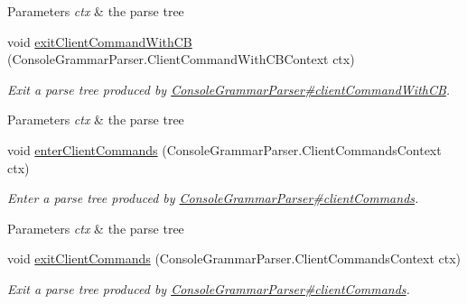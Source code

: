 \begin{DoxyCompactItemize}
\begin{DoxyCompactList}
\begin{DoxyParams}{Parameters}
{\em ctx} & the parse tree\\
\hline
\end{DoxyParams}
 \end{DoxyCompactList}\item 
void \hyperlink{classgov_1_1nasa_1_1jpf_1_1inspector_1_1client_1_1parser_1_1_console_grammar_base_listener_a18bdd4b1adc458d4564f2b51663d41d9}{exit\+Client\+Command\+With\+CB} (Console\+Grammar\+Parser.\+Client\+Command\+With\+C\+B\+Context ctx)
\begin{DoxyCompactList}\small\item\em Exit a parse tree produced by \hyperlink{classgov_1_1nasa_1_1jpf_1_1inspector_1_1client_1_1parser_1_1_console_grammar_parser_af370380e1a8bd00a938ccef2cf6a7b1b}{Console\+Grammar\+Parser\#client\+Command\+With\+CB}.


\begin{DoxyParams}{Parameters}
{\em ctx} & the parse tree\\
\hline
\end{DoxyParams}
 \end{DoxyCompactList}\item 
void \hyperlink{classgov_1_1nasa_1_1jpf_1_1inspector_1_1client_1_1parser_1_1_console_grammar_base_listener_aa5f4e51c8bd9beeebafcacc8dfad4c00}{enter\+Client\+Commands} (Console\+Grammar\+Parser.\+Client\+Commands\+Context ctx)
\begin{DoxyCompactList}\small\item\em Enter a parse tree produced by \hyperlink{classgov_1_1nasa_1_1jpf_1_1inspector_1_1client_1_1parser_1_1_console_grammar_parser_a72762b83792e740b30d2732282143634}{Console\+Grammar\+Parser\#client\+Commands}.


\begin{DoxyParams}{Parameters}
{\em ctx} & the parse tree\\
\hline
\end{DoxyParams}
 \end{DoxyCompactList}\item 
void \hyperlink{classgov_1_1nasa_1_1jpf_1_1inspector_1_1client_1_1parser_1_1_console_grammar_base_listener_a7840650e2cf2800448ad34170c50cfc0}{exit\+Client\+Commands} (Console\+Grammar\+Parser.\+Client\+Commands\+Context ctx)
\begin{DoxyCompactList}\small\item\em Exit a parse tree produced by \hyperlink{classgov_1_1nasa_1_1jpf_1_1inspector_1_1client_1_1parser_1_1_console_grammar_parser_a72762b83792e740b30d2732282143634}{Console\+Grammar\+Parser\#client\+Commands}.



\end{DoxyCompactList}
\end{DoxyCompactItemize}
